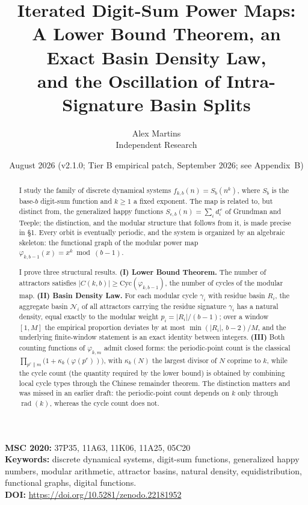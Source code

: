 \documentclass[11pt]{article}
\title{\textbf{Iterated Digit-Sum Power Maps:\\ A Lower Bound Theorem, an Exact Basin Density Law,\\ and the Oscillation of Intra-Signature Basin Splits}}
\author{Alex Martins\\ \small Independent Research}
\date{August 2026 (v2.1.0; Tier B empirical patch, September 2026; see Appendix~B)}
\theoremstyle{definition}
\theoremstyle{remark}
\newcommand{\Cyc}{\mathrm{Cyc}}
\DeclareMathOperator{\rad}{rad}
\begin{document}
\maketitle

\begin{center}
\small \textbf{MSC 2020:} 37P35, 11A63, 11K06, 11A25, 05C20\\
\small \textbf{Keywords:} discrete dynamical systems, digit-sum functions, generalized happy numbers, modular arithmetic, attractor basins, natural density, equidistribution, functional graphs, digital functions.\\
\small \textbf{DOI:} \url{https://doi.org/10.5281/zenodo.22181952}
\end{center}

\begin{abstract}
I study the family of discrete dynamical systems $f_{k,b}(n) = S_b(n^k)$, where $S_b$ is the base-$b$ digit-sum function and $k \ge 1$ a fixed exponent. The map is related to, but distinct from, the generalized happy functions $S_{e,b}(n) = \sum_i d_i^{\,e}$ of Grundman and Teeple; the distinction, and the modular structure that follows from it, is made precise in \S1. Every orbit is eventually periodic, and the system is organized by an algebraic skeleton: the functional graph of the modular power map $\varphi_{k,b-1}(x) = x^k \bmod (b-1)$.

I prove three structural results. \textbf{(I) Lower Bound Theorem.} The number of attractors satisfies $|C(k,b)| \ge \Cyc(\varphi_{k,b-1})$, the number of cycles of the modular map. \textbf{(II) Basin Density Law.} For each modular cycle $\gamma_i$ with residue basin $R_i$, the aggregate basin $\mathcal{N}_i$ of all attractors carrying the residue signature $\gamma_i$ has a natural density, equal exactly to the modular weight $p_i = |R_i|/(b-1)$; over a window $[1,M]$ the empirical proportion deviates by at most $\min(|R_i|,\,b-2)/M$, and the underlying finite-window statement is an exact identity between integers. \textbf{(III)} Both counting functions of $\varphi_{k,m}$ admit closed forms: the periodic-point count is the classical $\prod_{p^e \| m}\big(1 + \kappa_k(\varphi(p^e))\big)$, with $\kappa_k(N)$ the largest divisor of $N$ coprime to $k$, while the cycle count (the quantity required by the lower bound) is obtained by combining local cycle types through the Chinese remainder theorem. The distinction matters and was missed in an earlier draft: the periodic-point count depends on $k$ only through $\rad(k)$, whereas the cycle count does not.


\end{abstract}
\end{document}
